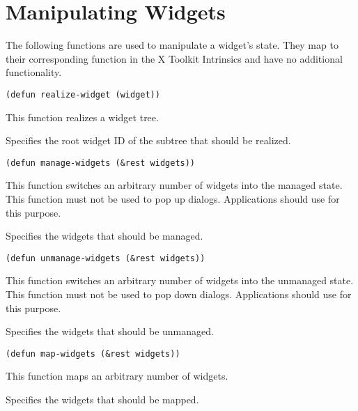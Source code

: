 \section{Manipulating Widgets}

The following functions are used to manipulate a widget's state. They map to
their corresponding function in the X Toolkit Intrinsics and have no additional
functionality.

\begin{lispd}
\syntax\begin{verbatim}
(defun realize-widget (widget))
\end{verbatim}
\beschr This function realizes a widget tree.
\parameter
\begin{paramd}
 Specifies the root widget ID of the subtree that should 
be realized.
\end{paramd}
\end{lispd}

\begin{lispd}
\syntax\begin{verbatim}
(defun manage-widgets (&rest widgets))
\end{verbatim}
\beschr This function switches an arbitrary number of widgets into the managed
state.
\hinweis This function must not be used to pop up dialogs. Applications should
use  for this purpose.
\parameter
\begin{paramd}
 Specifies the widgets that should be managed.
\end{paramd}
\end{lispd}

\begin{lispd}
\syntax\begin{verbatim}
(defun unmanage-widgets (&rest widgets))
\end{verbatim}
\beschr This function switches an arbitrary number of widgets into the unmanaged
state.
\hinweis This function must not be used to pop down dialogs. Applications should
use  for this purpose.
\parameter
\begin{paramd}
 Specifies the widgets that should be unmanaged.
\end{paramd}
\end{lispd}

\begin{lispd}
\syntax\begin{verbatim}
(defun map-widgets (&rest widgets))
\end{verbatim}
\beschr This function maps an arbitrary number of widgets.
\parameter
\begin{paramd}
 Specifies the widgets that should be mapped.
\end{paramd}
\end{lispd}

